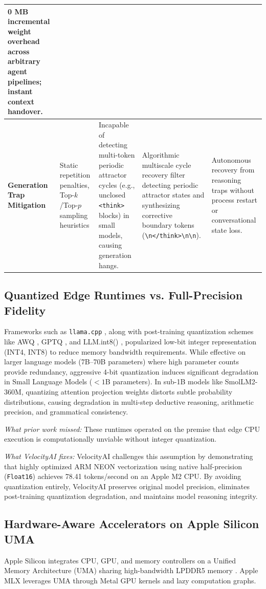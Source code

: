 \documentclass[a4paper,twocolumn,10pt]{article}
\begin{document}
\begin{table}[t]
{\begin{tabular}{p{2.8cm} p{2.8cm} p{4.6cm} p{4.6cm} p{3.2cm}}
0 MB incremental weight overhead across arbitrary agent pipelines; instant context handover. \\
\midrule
\textbf{Generation Trap Mitigation} & 
Static repetition penalties, Top-$k$/Top-$p$ sampling heuristics & 
Incapable of detecting multi-token periodic attractor cycles (e.g., unclosed \texttt{<think>} blocks) in small models, causing generation hangs. & 
Algorithmic multiscale cycle recovery filter detecting periodic attractor states and synthesizing corrective boundary tokens (\texttt{\textbackslash{}n</think>\textbackslash{}n\textbackslash{}n}). & 
Autonomous recovery from reasoning traps without process restart or conversational state loss. \\
\bottomrule
\end{tabular}%
}
\end{table}

\subsection{Quantized Edge Runtimes vs. Full-Precision Fidelity}
Frameworks such as \texttt{llama.cpp} \cite{gerganov2023llama}, along with post-training quantization schemes like AWQ \cite{lin2023awq}, GPTQ \cite{frantar2022gptq}, and LLM.int8() \cite{dettmers2022llm}, popularized low-bit integer representation (INT4, INT8) to reduce memory bandwidth requirements. While effective on larger language models (7B--70B parameters) where high parameter counts provide redundancy, aggressive 4-bit quantization induces significant degradation in Small Language Models ($<1$B parameters). In sub-1B models like SmolLM2-360M, quantizing attention projection weights distorts subtle probability distributions, causing degradation in multi-step deductive reasoning, arithmetic precision, and grammatical consistency. 

\textit{What prior work missed:} These runtimes operated on the premise that edge CPU execution is computationally unviable without integer quantization. 

\textit{What VelocityAI fixes:} VelocityAI challenges this assumption by demonstrating that highly optimized ARM NEON vectorization using native half-precision (\texttt{Float16}) achieves 78.41 tokens/second on an Apple M2 CPU. By avoiding quantization entirely, VelocityAI preserves original model precision, eliminates post-training quantization degradation, and maintains model reasoning integrity.

\subsection{Hardware-Aware Accelerators on Apple Silicon UMA}
Apple Silicon integrates CPU, GPU, and memory controllers on a Unified Memory Architecture (UMA) sharing high-bandwidth LPDDR5 memory \cite{hannun2023mlx}. Apple MLX leverages UMA through Metal GPU kernels and lazy computation graphs. 
\end{document}
